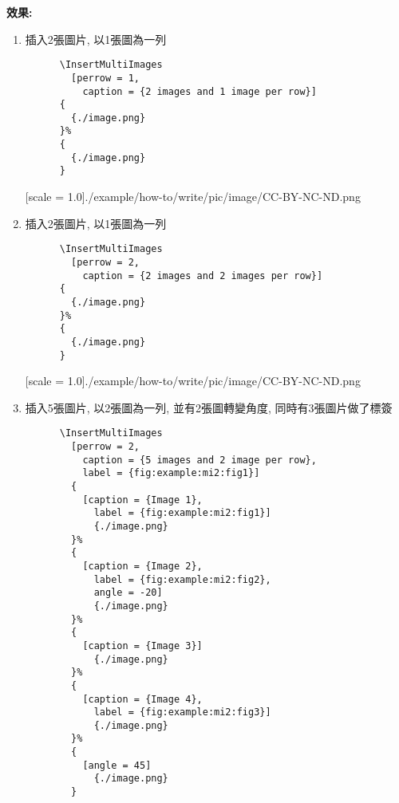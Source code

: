   \newpage

  {\bf 效果:}
  \begin{enumerate}
    \item
    {
      插入2張圖片, 以1張圖為一列
      \begin{verbatim}
      \InsertMultiImages
        [perrow = 1,
          caption = {2 images and 1 image per row}]
      {
        {./image.png}
      }%
      {
        {./image.png}
      }
      \end{verbatim}
      {
        [scale = 1.0]{./example/how-to/write/pic/image/CC-BY-NC-ND.png}
      }
    } %

    \item
    {
      插入2張圖片, 以1張圖為一列
      \begin{verbatim}
      \InsertMultiImages
        [perrow = 2,
          caption = {2 images and 2 images per row}]
      {
        {./image.png}
      }%
      {
        {./image.png}
      }
      \end{verbatim}
      {
        [scale = 1.0]{./example/how-to/write/pic/image/CC-BY-NC-ND.png}
      }
    } %

    \newpage
    \item
    {
      插入5張圖片, 以2張圖為一列, 並有2張圖轉變角度, 同時有3張圖片做了標簽
      \begin{verbatim}
      \InsertMultiImages
        [perrow = 2,
          caption = {5 images and 2 image per row},
          label = {fig:example:mi2:fig1}]
        {
          [caption = {Image 1},
            label = {fig:example:mi2:fig1}]
            {./image.png}
        }%
        {
          [caption = {Image 2},
            label = {fig:example:mi2:fig2},
            angle = -20]
            {./image.png}
        }%
        {
          [caption = {Image 3}]
            {./image.png}
        }%
        {
          [caption = {Image 4},
            label = {fig:example:mi2:fig3}]
            {./image.png}
        }%
        {
          [angle = 45]
            {./image.png}
        }
      \end{verbatim}

}
\end{enumerate}
